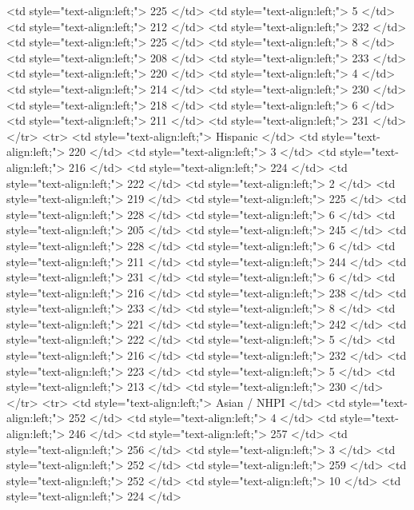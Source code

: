    <td style="text-align:left;"> 225 </td>
   <td style="text-align:left;"> 5 </td>
   <td style="text-align:left;"> 212 </td>
   <td style="text-align:left;"> 232 </td>
   <td style="text-align:left;"> 225 </td>
   <td style="text-align:left;"> 8 </td>
   <td style="text-align:left;"> 208 </td>
   <td style="text-align:left;"> 233 </td>
   <td style="text-align:left;"> 220 </td>
   <td style="text-align:left;"> 4 </td>
   <td style="text-align:left;"> 214 </td>
   <td style="text-align:left;"> 230 </td>
   <td style="text-align:left;"> 218 </td>
   <td style="text-align:left;"> 6 </td>
   <td style="text-align:left;"> 211 </td>
   <td style="text-align:left;"> 231 </td>
  </tr>
  <tr>
   <td style="text-align:left;"> Hispanic </td>
   <td style="text-align:left;"> 220 </td>
   <td style="text-align:left;"> 3 </td>
   <td style="text-align:left;"> 216 </td>
   <td style="text-align:left;"> 224 </td>
   <td style="text-align:left;"> 222 </td>
   <td style="text-align:left;"> 2 </td>
   <td style="text-align:left;"> 219 </td>
   <td style="text-align:left;"> 225 </td>
   <td style="text-align:left;"> 228 </td>
   <td style="text-align:left;"> 6 </td>
   <td style="text-align:left;"> 205 </td>
   <td style="text-align:left;"> 245 </td>
   <td style="text-align:left;"> 228 </td>
   <td style="text-align:left;"> 6 </td>
   <td style="text-align:left;"> 211 </td>
   <td style="text-align:left;"> 244 </td>
   <td style="text-align:left;"> 231 </td>
   <td style="text-align:left;"> 6 </td>
   <td style="text-align:left;"> 216 </td>
   <td style="text-align:left;"> 238 </td>
   <td style="text-align:left;"> 233 </td>
   <td style="text-align:left;"> 8 </td>
   <td style="text-align:left;"> 221 </td>
   <td style="text-align:left;"> 242 </td>
   <td style="text-align:left;"> 222 </td>
   <td style="text-align:left;"> 5 </td>
   <td style="text-align:left;"> 216 </td>
   <td style="text-align:left;"> 232 </td>
   <td style="text-align:left;"> 223 </td>
   <td style="text-align:left;"> 5 </td>
   <td style="text-align:left;"> 213 </td>
   <td style="text-align:left;"> 230 </td>
  </tr>
  <tr>
   <td style="text-align:left;"> Asian / NHPI </td>
   <td style="text-align:left;"> 252 </td>
   <td style="text-align:left;"> 4 </td>
   <td style="text-align:left;"> 246 </td>
   <td style="text-align:left;"> 257 </td>
   <td style="text-align:left;"> 256 </td>
   <td style="text-align:left;"> 3 </td>
   <td style="text-align:left;"> 252 </td>
   <td style="text-align:left;"> 259 </td>
   <td style="text-align:left;"> 252 </td>
   <td style="text-align:left;"> 10 </td>
   <td style="text-align:left;"> 224 </td>
